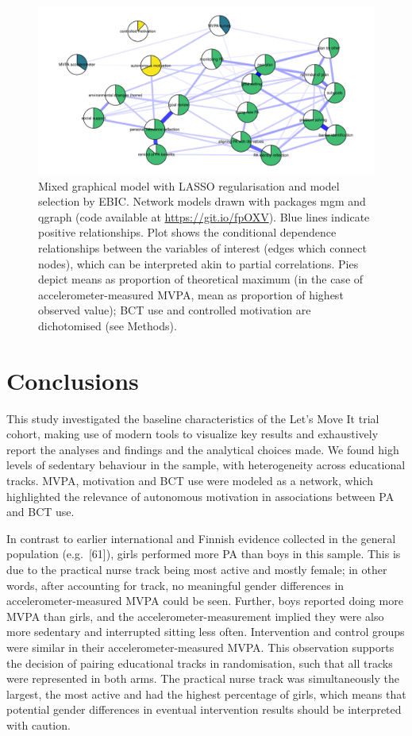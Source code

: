 \documentclass[english,man,floatsintext]{apa6}
\begin{document}
\begin{figure}
\centering
\includegraphics{_baseline-manuscript_files/figure-latex/network-plot-1.pdf}
\caption{\label{fig:network-plot}Mixed graphical model with LASSO regularisation and model selection by EBIC. Network models drawn with packages mgm and qgraph (code available at \url{https://git.io/fpOXV}). Blue lines indicate positive relationships. Plot shows the conditional dependence relationships between the variables of interest (edges which connect nodes), which can be interpreted akin to partial correlations. Pies depict means as proportion of theoretical maximum (in the case of accelerometer-measured MVPA, mean as proportion of highest observed value); BCT use and controlled motivation are dichotomised (see Methods).}
\end{figure}

\hypertarget{conclusions}{%
\section{Conclusions}\label{conclusions}}

This study investigated the baseline characteristics of the Let's Move It trial cohort, making use of modern tools to visualize key results and exhaustively report the analyses and findings and the analytical choices made. We found high levels of sedentary behaviour in the sample, with heterogeneity across educational tracks. MVPA, motivation and BCT use were modeled as a network, which highlighted the relevance of autonomous motivation in associations between PA and BCT use.

In contrast to earlier international and Finnish evidence collected in the general population (e.g.~{[}61{]}), girls performed more PA than boys in this sample. This is due to the practical nurse track being most active and mostly female; in other words, after accounting for track, no meaningful gender differences in accelerometer-measured MVPA could be seen. Further, boys reported doing more MVPA than girls, and the accelerometer-measurement implied they were also more sedentary and interrupted sitting less often. Intervention and control groups were similar in their accelerometer-measured MVPA. This observation supports the decision of pairing educational tracks in randomisation, such that all tracks were represented in both arms. The practical nurse track was simultaneously the largest, the most active and had the highest percentage of girls, which means that potential gender differences in eventual intervention results should be interpreted with caution.
\end{document}
